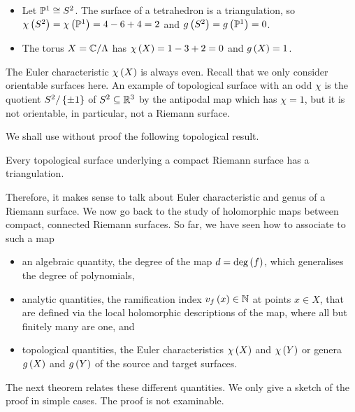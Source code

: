 \begin{example*}
\hfill
\begin{itemize}
\item Let $ \P^1 \cong S^2 $. The surface of a tetrahedron is a triangulation, so $ \chi\br{S^2} = \chi\br{\P^1} = 4 - 6 + 4 = 2 $ and $ g\br{S^2} = g\br{\P^1} = 0 $.
\item The torus $ X = \C / \Lambda $ has $ \chi\br{X} = 1 - 3 + 2 = 0 $ and $ g\br{X} = 1 $.
\end{itemize}
\end{example*}

\begin{remark}
The Euler characteristic $ \chi\br{X} $ is always even. Recall that we only consider orientable surfaces here. An example of topological surface with an odd $ \chi $ is the quotient $ S^2 / \cbr{\pm 1} $ of $ S^2 \subseteq \R^3 $ by the antipodal map which has $ \chi = 1 $, but it is not orientable, in particular, not a Riemann surface.
\end{remark}

We shall use without proof the following topological result.

\begin{theorem}
Every topological surface underlying a compact Riemann surface has a triangulation.
\end{theorem}


Therefore, it makes sense to talk about Euler characteristic and genus of a Riemann surface. We now go back to the study of holomorphic maps between compact, connected Riemann surfaces. So far, we have seen how to associate to such a map
\begin{itemize}
\item an algebraic quantity, the degree of the map $ d = \deg\br{f} $, which generalises the degree of polynomials,
\item analytic quantities, the ramification index $ v_f\br{x} \in \N $ at points $ x \in X $, that are defined via the local holomorphic descriptions of the map, where all but finitely many are one, and
\item topological quantities, the Euler characteristics $ \chi\br{X} $ and $ \chi\br{Y} $ or genera $ g\br{X} $ and $ g\br{Y} $ of the source and target surfaces.
\end{itemize}
The next theorem relates these different quantities. We only give a sketch of the proof in simple cases. The proof is not examinable.

